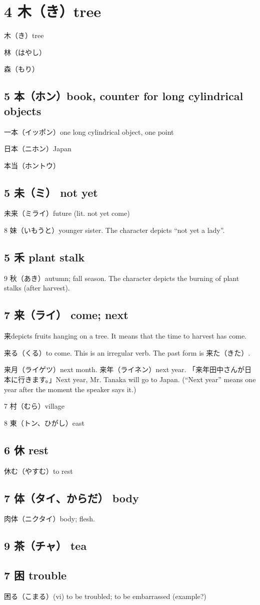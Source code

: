 \chapter{4 木（き）tree}

木（き）tree

林（はやし）

森（もり）

\section{5 本（ホン）book, counter for long cylindrical objects}

一本（イッポン）one long cylindrical object, one point

日本（ニホン）Japan

本当（ホントウ）

\section{5 未（ミ） not yet}

未来（ミライ）future (lit. not yet come)

8 妹（いもうと）younger sister.
The character depicts ``not yet a lady''.

\section{5 禾 plant stalk}

9 秋（あき）autumn; fall season.
The character depicts the burning of plant stalks (after harvest).

\section{7 来（ライ） come; next}

来depicts fruits hanging on a tree.
It means that the time to harvest has come.

来る（くる）to come. This is an irregular verb. The past form is 来た（きた）.

来月（ライゲツ）next month.
来年（ライネン）next year.
「来年田中さんが日本に行きます。」Next year, Mr. Tanaka will go to Japan.
(``Next year'' means one year after the moment the speaker says it.)

7 村（むら）village

8 東（トン、ひがし）east

\section{6 休 rest}

休む（やすむ）to rest

\section{7 体（タイ、からだ） body}

肉体（ニクタイ）body; flesh.

\section{9 茶（チャ） tea}

\section{7 困 trouble}

困る（こまる）(vi) to be troubled; to be embarrassed
(example?)
